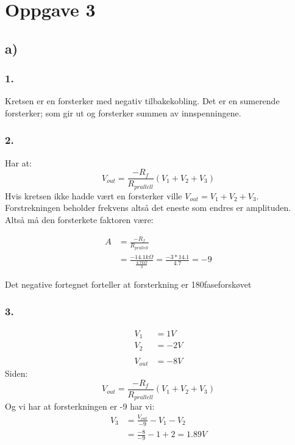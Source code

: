 \documentclass[a4paper, norsk, twoside, 10pt]{article}
\begin{document}
\newpage

\section*{Oppgave 3}
\subsection*{a)}
\subsubsection*{1.}
Kretsen er en forsterker med negativ tilbakekobling. Det er en sumerende forsterker; som gir ut og forsterker summen av innspenningene. 



\subsubsection*{2.}
Har at:
\[V_{out} = \frac{-R_{f}}{R_{prallell}} (V_{1} + V_{2} + V_{3})\]
Hvis kretsen ikke hadde vært en forsterker ville $V_{out} = V_{1} + V_{2} + V_{3}$. Forstrekningen beholder frekvens altså det eneste som endres er amplituden. Altså må den forsterkete faktoren være:


\begin{align*}
  A &= \frac{-R_{f}}{R_{prallell}} \\
  &= \frac{-14.1k\Omega}{\frac{4.7k\Omega}{3}}  = \frac{-3*14.1}{4.7}  = -9
\end{align*}

Det negative fortegnet forteller at forsterkning er 180\degree faseforskøvet



\subsubsection*{3.}
\begin{align*}
  V_{1} &= 1V \\
  V_{2} &= -2V\\
  \\
  V_{out} &= -8V
\end{align*}
Siden:
\[V_{out} = \frac{-R_{f}}{R_{prallell}} (V_{1} + V_{2} + V_{3})\]
Og vi har at forsterkningen er -9 har vi:
\begin{align*}
  V_{3} &= \frac{V_{out}}{-9}- V_{1} - V_{2} \\
  &= \frac{-8}{-9}- 1 + 2 = 1.89 V
\end{align*}
\end{document}
